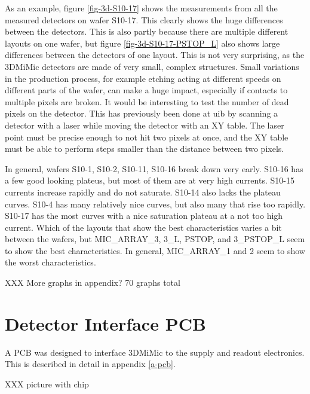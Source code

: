 \documentclass[../main/thesis.tex]{subfiles}
\begin{document}
As an example, figure \ref{fig-3d-S10-17} shows the measurements from all the measured detectors on wafer S10-17. This clearly shows the huge differences between the detectors. This is also partly because there are multiple different layouts on one wafer, but figure \ref{fig-3d-S10-17-PSTOP_L} also shows large differences between the detectors of one layout. This is not very surprising, as the 3DMiMic detectors are made of very small, complex structures. Small variations in the production process, for example etching acting at different speeds on different parts of the wafer, can make a huge impact, especially if contacts to multiple pixels are broken. It would be interesting to test the number of dead pixels on the detector. This has previously been done at \gls{uib} by scanning a detector with a laser while moving the detector with an XY table. The laser point must be precise enough to not hit two pixels at once, and the XY table must be able to perform steps smaller than the distance between two pixels.  

In general, wafers S10-1, S10-2, S10-11, S10-16 break down very early. S10-16 has a few good looking plateus, but most of them are at very high currents. S10-15 currents increase rapidly and do not saturate. S10-14 also lacks the plateau curves. S10-4 has many relatively nice curves, but also many that rise too rapidly. S10-17 has the most curves with a nice saturation plateau at a not too high current. Which of the layouts that show the best characteristics varies a bit between the wafers, but MIC\_ARRAY\_3, 3\_L, PSTOP, and 3\_PSTOP\_L seem to show the best characteristics. In general, MIC\_ARRAY\_1 and 2 seem to show the worst characteristics. 

XXX More graphs in appendix? 70 graphs total

\section{Detector Interface PCB}
\label{3d-pcb}
A \gls{PCB} was designed to interface 3DMiMic to the supply and readout electronics. This is described in detail in appendix \ref{a-pcb}.

XXX picture with chip
\end{document}
